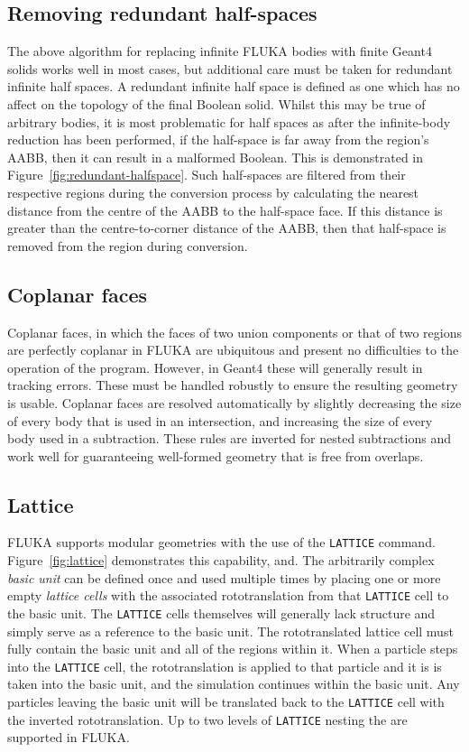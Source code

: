 \documentclass[final,5p,times,twocolumn]{elsarticle}
\newcommand{\fluka}[1]{\texttt{\MakeUppercase{#1}}}
\begin{document}
\subsection{Removing redundant half-spaces}
The above algorithm for replacing infinite FLUKA bodies with finite
Geant4 solids works well in most cases, but additional care must be
taken for redundant infinite half spaces.  A redundant infinite half
space is defined as one which has no affect on the topology of the
final Boolean solid.  Whilst this may be true of arbitrary bodies, it
is most problematic for half spaces as after the infinite-body
reduction has been performed, if the half-space is far away from the
region's AABB, then it can result in a malformed Boolean.  This is
demonstrated in Figure~\ref{fig:redundant-halfspace}.  Such
half-spaces are filtered from their respective regions during the
conversion process by calculating the nearest distance from the centre
of the AABB to the half-space face.  If this distance is greater than
the centre-to-corner distance of the AABB, then that half-space is
removed from the region during conversion.

\subsection{Coplanar faces}
Coplanar faces, in which the faces of two union components or that of
two regions are perfectly coplanar in FLUKA are ubiquitous and present
no difficulties to the operation of the program.  However, in Geant4
these will generally result in tracking errors.  These must be handled
robustly to ensure the resulting geometry is usable.  Coplanar faces
are resolved automatically by slightly decreasing the size of every
body that is used in an intersection, and increasing the size of every
body used in a subtraction.  These rules are inverted for nested
subtractions and work well for guaranteeing well-formed geometry that
is free from overlaps.

\subsection{Lattice}

FLUKA supports modular geometries with the use of the \fluka{lattice}
command. Figure~\ref{fig:lattice} demonstrates this capability, and. The
arbitrarily complex \textit{basic unit} can be defined once and used
multiple times by placing one or more empty \textit{lattice cells} with the
associated rototranslation from that \fluka{lattice} cell to the basic
unit. The \fluka{lattice} cells themselves will generally lack structure
and simply serve as a reference to the basic unit. The rototranslated
lattice cell must fully contain the basic unit and all of the regions
within it. When a particle steps into the \fluka{lattice} cell, the
rototranslation is applied to that particle and it is is taken into the
basic unit, and the simulation continues within the basic unit. Any
particles leaving the basic unit will be translated back to the
\fluka{lattice} cell with the inverted rototranslation. Up to two
levels of \fluka{lattice} nesting the are supported in FLUKA.
\end{document}
